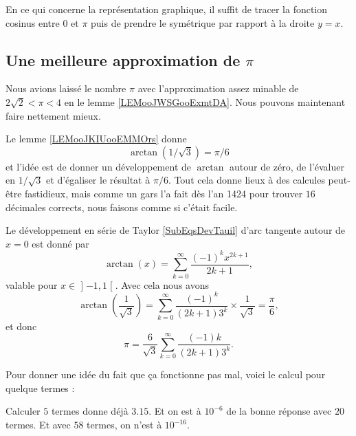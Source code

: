 En ce qui concerne la représentation graphique, il suffit de tracer la fonction cosinus entre \( 0\) et \( \pi\) puis de prendre le symétrique par rapport à la droite \( y=x\).

\begin{center}
    
\end{center}

\subsection{Une meilleure approximation de \( \pi\)}

Nous avions laissé le nombre \( \pi\) avec l'approximation assez minable de \( 2\sqrt{ 2 }<\pi<4\) en le lemme \ref{LEMooJWSGooExmtDA}. Nous pouvons maintenant faire nettement mieux.

Le lemme \ref{LEMooJKIUooEMMOrs} donne
\begin{equation}
    \arctan(1/\sqrt{ 3 })=\pi/6
\end{equation}
et l'idée est de donner un développement de \( \arctan\) autour de zéro, de l'évaluer en \( 1/\sqrt{ 3 }\) et d'égaliser le résultat à \( \pi/6\). Tout cela donne lieux à des calcules peut-être fastidieux, mais comme un gars l'a fait dès l'an 1424\cite{ooOMUNooGROVUu} pour trouver \( 16\) décimales corrects, nous faisons comme si c'était facile.

Le développement en série de Taylor \ref{SubEqsDevTauil} d'arc tangente autour de \( x=0\) est donné par
\begin{equation}
    \arctan(x)=\sum_{k=0}^{\infty}\frac{ (-1)^{k}x^{2k+1} }{ 2k+1 },
\end{equation}
valable pour \( x\in \mathopen] -1 , 1 \mathclose[\). Avec cela nous avons
\begin{equation}
    \arctan(\frac{1}{ \sqrt{ 3 } })=\sum_{k=0}^{\infty}\frac{ (-1)^k }{ (2k+1)3^k }\times \frac{1}{ \sqrt{ 3 } }=\frac{ \pi }{ 6 },
\end{equation}
et donc
\begin{equation}
    \pi=\frac{ 6 }{ \sqrt{ 3 } }\sum_{k=0}^{\infty}\frac{ (-1)k }{ (2k+1)3^k }.
\end{equation}

Pour donner une idée du fait que ça fonctionne pas mal, voici le calcul pour quelque termes :

Calculer \( 5\) termes donne déjà \( 3.15\). Et on est à \( 10^{-6}\) de la bonne réponse avec \( 20\) termes. Et avec $58$ termes, on n'est à \( 10^{-16}\).

